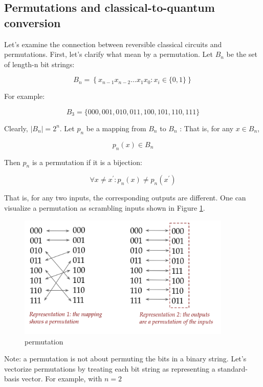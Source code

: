 \documentclass[main.tex]{subfiles}
\begin{document}
\subsection{Permutations and classical-to-quantum conversion}
    
    Let's examine the connection between reversible classical circuits and permutations. First, let's clarify what mean by a permutation. Let $B_{n}$ be the set of length-n bit strings:
    
    $$
    B_{n}=\left\{x_{n-1} x_{n-2} \ldots x_{1} x_{0}: x_{i} \in\{0,1\}\right\}
    $$
    
    For example:
    
    $$
    B_{3}=\{000,001,010,011,100,101,110,111\}
    $$
    
    Clearly, $\left|B_{n}\right|=2^{n}$. Let $p_{n}$ be a mapping from $B_{n}$ to $B_{n}$ : That is, for any $x \in B_{n}$,
    
    $$
    p_{n}(x) \in B_{n}
    $$
    
    Then $p_{n}$ is a permutation if it is a bijection:
    
    $$
    \forall x \neq x^{\prime}: p_{n}(x) \neq p_{n}\left(x^{\prime}\right)
    $$
    
    That is, for any two inputs, the corresponding outputs are different. One can visualize a permutation as scrambling inputs shown in Figure \ref{fig:27permutation}.
    
    \begin{figure}
        \centering
        \includegraphics[width=4in]{notes/figs/n10/27permutation.png}
        \caption{permutation}
        \label{fig:27permutation}
    \end{figure}
    
    Note: a permutation is not about permuting the bits in a binary string. Let's vectorize permutations by treating each bit string as representing a standard-basis vector. For example, with $n=2$
    
\end{document}
